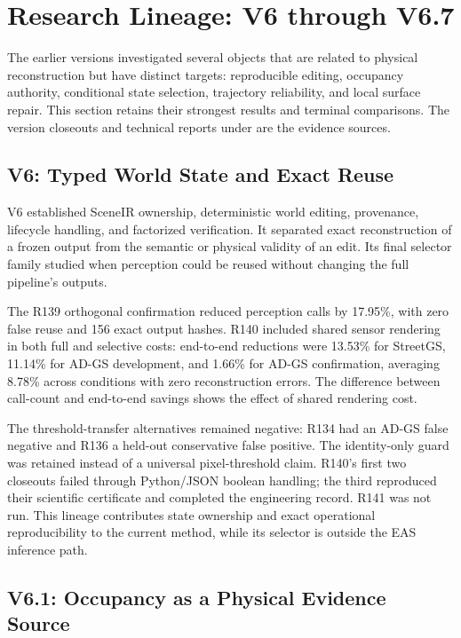 \section{Research Lineage: V6 through V6.7}
\label{sec:archive-lineage}

The earlier versions investigated several objects that are related to physical reconstruction but have distinct
targets: reproducible editing, occupancy authority, conditional state selection, trajectory reliability,
and local surface repair. This section retains their strongest results and terminal comparisons.
The version closeouts and technical reports under  are the evidence sources.

\subsection{V6: Typed World State and Exact Reuse}

V6 established SceneIR ownership, deterministic world editing, provenance, lifecycle handling, and factorized
verification. It separated exact reconstruction of a frozen output from the semantic or physical validity of an edit.
Its final selector family studied when perception could be reused without changing the full pipeline's outputs.

The R139 orthogonal confirmation reduced perception calls by 17.95\%, with zero false reuse and
156 exact output hashes. R140 included shared sensor rendering in both full and selective costs:
end-to-end reductions were 13.53\% for StreetGS, 11.14\% for AD-GS development, and 1.66\% for
AD-GS confirmation, averaging 8.78\% across conditions with zero reconstruction errors.
The difference between call-count and end-to-end savings shows the effect of shared rendering cost.

The threshold-transfer alternatives remained negative: R134 had an AD-GS false negative and R136 a
held-out conservative false positive. The identity-only guard was retained instead of a universal
pixel-threshold claim. R140's first two closeouts failed through Python/JSON boolean handling;
the third reproduced their scientific certificate and completed the engineering record.
R141 was not run. This lineage contributes state ownership and exact operational reproducibility to
the current method, while its selector is outside the EAS inference path.

\subsection{V6.1: Occupancy as a Physical Evidence Source}

